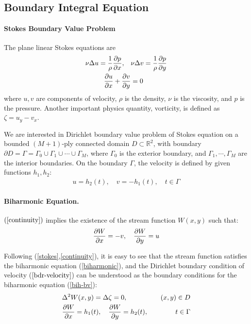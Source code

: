 \documentclass[10pt,twocolumn]{article}
\begin{document}
\subsection{Boundary Integral Equation}

\paragraph{Stokes Boundary Value Problem}

The plane linear Stokes equations are
\begin{align}
  \nu \Delta u = \frac 1 \rho \pdv{p}{x},\quad &\nu \Delta v = \frac 1\rho \pdv{p}{y} 
  \label{stokes} \\
  \pdv{u}{x} + \pdv{v}{y} &= 0
  \label{continuity}
\end{align}
where $u,v$ are components of velocity, 
$\rho$ is the density, 
$\nu$ is the viscosity, 
and $p$ is the pressure. 
Another important physics quantity, vorticity, is defined as $\zeta  = u_y - v_x$. 

We are interested in Dirichlet boundary value problem of Stokes equation on 
a bounded $(M+1)$-ply connected domain $D\subset \mathbb R^2$,
with boundary $\partial D =  \Gamma = \Gamma_0 \cup \Gamma_1 \cup \cdots \cup \Gamma_M$, 
where $\Gamma_0$ is the exterior boundary, and $\Gamma_1,\cdots, \Gamma_M$ are the interior boundaries. 
On the boundary $\Gamma$, the velocity is defined by given functions $h_1,h_2$:
\begin{align}
  u = h_2(t),\quad v = - h_1(t), \quad t\in \Gamma
  \label{bdr-velocity}
\end{align}


\paragraph*{Biharmonic Equation.} $(\ref{continuity})$ implies the existence of the stream function $W(x,y)$ such that:
\begin{align}
  \pdv{W}{x} = -v,\quad \pdv{W}{y} = u \label{stream-1}
\end{align}

Following (\ref{stokes},\ref{continuity}), it is easy to see that the stream function satisfies the biharmonic equation (\ref{biharmonic}),
and the Dirichlet boundary condition of velocity ($\ref{bdr-velocity}$) can be understood as 
the boundary conditions for the biharmonic equation (\ref{bih-bv}):
\begin{align}
  &\Delta^2 W(x,y) = \Delta \zeta = 0, &(x,y)\in D \label{biharmonic}\\
  &\pdv{W}{x}(t) = h_1(t),\quad \pdv{W}{y}(t) = h_2(t), \quad &t\in \Gamma\label{bih-bv}
\end{align}
\end{document}
